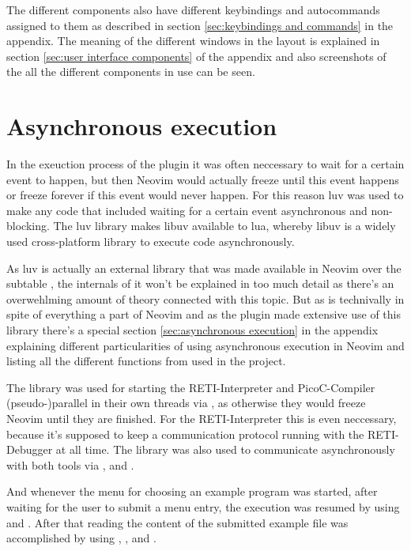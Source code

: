 \documentclass{report}
\begin{document}
The different components also have different keybindings and autocommands assigned to them as described in section \ref{sec:keybindings and commands} in the appendix. The meaning of the different windows in the layout is explained in section \ref{sec:user interface components} of the appendix and also screenshots of the all the different components in use can be seen.


\section{Asynchronous execution}
\label{sec:asynchronous execution with libuv}

In the exeuction process of the plugin it was often neccessary to wait for a certain event to happen, but then Neovim would actually freeze until this event happens or freeze forever if this event would never happen. For this reason \alert{luv}\cite{LuvitLuvBare} was used to make any code that included waiting for a certain event asynchronous and non-blocking. The luv library makes \alert{libuv}\cite{LibuvLibuvCrossplatform} available to lua, whereby libuv is a widely used cross-platform library to execute code asynchronously.

As luv is actually an external library that was made available in Neovim over the subtable , the internals of it won't be explained in too much detail as there's an overwehlming amount of theory connected with this topic. But as  is technivally in spite of everything a part of Neovim and as the plugin made extensive use of this library there's a special section \ref{sec:asynchronous execution} in the appendix explaining different particularities of using asynchronous execution in Neovim and listing all the different functions from  used in the project.

The library was used for starting the RETI-Interpreter and PicoC-Compiler \alert{(pseudo-)parallel} in their own \alert{threads} via , as otherwise they would freeze Neovim until they are finished. For the RETI-Interpreter this is even neccessary, because it's supposed to keep a communication protocol running with the RETI-Debugger at all time. The library was also used to communicate asynchronously with both tools via ,  and . 

And whenever the menu for choosing an example program was started, after waiting for the user to submit a menu entry, the execution was resumed by using  and . After that reading the content of the submitted example file was accomplished by using , ,  and . 
\end{document}
